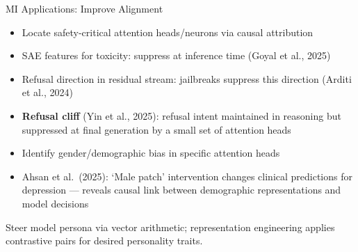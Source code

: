 \begin{frame}{MI Applications: Improve Alignment }
  \begin{tcolorbox}[enhanced, colback=UCRlgray, colframe=UCRmgray,
      borderline west={4pt}{0pt}{UCRnavy}, sharp corners,
      fonttitle=\bfseries\small\color{UCRnavy}, title=Safety \& Reliability,
      top=3pt, bottom=3pt]
    \begin{itemize}\footnotesize\setlength\itemsep{2pt}
      \item Locate safety-critical attention heads/neurons via causal attribution
      \item SAE features for toxicity: suppress at inference time (Goyal et al., 2025)
      \item Refusal direction in residual stream: jailbreaks suppress this direction
        (Arditi et al., 2024)
      \item \textbf{Refusal cliff} (Yin et al., 2025): refusal intent maintained in
        reasoning but suppressed at final generation by a small set of attention heads
    \end{itemize}
  \end{tcolorbox}
  \vspace{3pt}
  \begin{tcolorbox}[enhanced, colback=UCRlgray, colframe=UCRmgray,
      borderline west={4pt}{0pt}{UCRnavy}, sharp corners,
      fonttitle=\bfseries\small\color{UCRnavy}, title=Fairness \& Bias,
      top=3pt, bottom=3pt]
    \begin{itemize}\footnotesize\setlength\itemsep{2pt}
      \item Identify gender/demographic bias in specific attention heads
      \item Ahsan et al.\ (2025): `Male patch' intervention changes clinical predictions
        for depression --- reveals causal link between demographic representations and
        model decisions
    \end{itemize}
  \end{tcolorbox}
  \vspace{3pt}
  \begin{tcolorbox}[enhanced, colback=UCRlgray, colframe=UCRmgray,
      borderline west={4pt}{0pt}{UCRnavy}, sharp corners,
      fonttitle=\bfseries\small\color{UCRnavy}, title=Persona \& Role,
      top=3pt, bottom=3pt]
    \footnotesize Steer model persona via vector arithmetic; representation
    engineering applies contrastive pairs for desired personality traits.
  \end{tcolorbox}
\end{frame}

